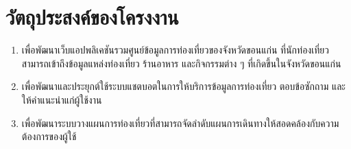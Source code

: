 \section{วัตถุประสงค์ของโครงงาน}
\begin{enumerate}[label=\thesection.\arabic*, ref=\thesection.\arabic*, leftmargin=2.2cm]
\item เพื่อพัฒนาเว็บแอปพลิเคชันรวมศูนย์ข้อมูลการท่องเที่ยวของจังหวัดขอนแก่น ที่นักท่องเที่ยวสามารถเข้าถึงข้อมูลแหล่งท่องเที่ยว ร้านอาหาร และกิจกรรมต่าง ๆ ที่เกิดขึ้นในจังหวัดขอนแก่น
\item เพื่อพัฒนาและประยุกต์ใช้ระบบแชตบอตในการให้บริการข้อมูลการท่องเที่ยว ตอบข้อซักถาม และให้คำแนะนำแก่ผู้ใช้งาน
\item เพื่อพัฒนาระบบวางแผนการท่องเที่ยวที่สามารถจัดลำดับแผนการเดินทางให้สอดคล้องกับความต้องการของผู้ใช้
\end{enumerate}

